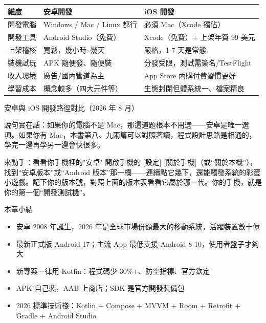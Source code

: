 \begin{center}
\begin{tabularx}{\linewidth}{|X|X|X|}
\hline
\textbf{維度} & \textbf{安卓開發} & \textbf{iOS 開發} \tabularnewline
\hline
開發電腦 & Windows / Mac / Linux 都行 & 必須 Mac（Xcode 獨佔） \tabularnewline
開發工具 & Android Studio（免費） & Xcode（免費）+ 上架年費 99 美元 \tabularnewline
上架稽核 & 寬鬆，幾小時\textasciitilde{}幾天 & 嚴格，1-7 天是常態 \tabularnewline
裝機試玩 & APK 隨便發、隨便裝 & 分發受限，測試需簽名/TestFlight \tabularnewline
收入環境 & 廣告/國內管道為主 & App Store 內購付費習慣更好 \tabularnewline
學習成本 & 概念較多（四大元件等） & 生態封閉但體系統一、檔案精良 \tabularnewline
\hline
\end{tabularx}
\end{center}

\begin{center}\small\color{gray}安卓與 iOS 開發路徑對比（2026 年 8 月）\end{center}

說句實在話：如果你的電腦不是 Mac，那這道題根本不用選——安卓是唯一選項。如果你有 Mac，本書第八、九兩篇可以對照著讀，程式設計思路是相通的，學完一邊再學另一邊會快很多。

\begin{tcbpractice}{來動手：看看你手機裡的"安卓"}
開啟手機的 [設定] [關於手機]（或“關於本機”），找到“安卓版本”或“Android 版本”那一欄——連續點它幾下，還能觸發系統的彩蛋小遊戲。記下你的版本號，對照上面的版本表看看它屬於哪一代。你的手機，就是你的第一個“開發測試機”。

\end{tcbpractice}

\begin{tcbsummary}{本章小結}
\begin{itemize}
  \item 安卓 2008 年誕生，2026 年是全球市場份額最大的移動系統，活躍裝置數十億
  \item 最新正式版 Android 17；主流 App 最低支援 Android 8-10，使用者盤子才夠大
  \item 新專案一律用 Kotlin：程式碼少 30\%+、防空指標、官方欽定
  \item APK 自己裝，AAB 上商店；SDK 是官方開發裝備包
  \item 2026 標準技術棧：Kotlin + Compose + MVVM + Room + Retrofit + Gradle + Android Studio
\end{itemize}

\end{tcbsummary}
